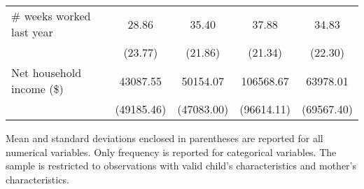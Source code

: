 \begin{table}[!t]
\begin{threeparttable}
\begin{tabular}{l*{4}{c}}
$\#$ weeks worked last year&       28.86&       35.40&       37.88&       34.83\\
                    &     (23.77)&     (21.86)&     (21.34)&     (22.30)\\

Net household income (\$)&    43087.55&    50154.07&   106568.67&    63978.01\\
                    &  (49185.46)&  (47083.00)&  (96614.11)&  (69567.40)\\
\bottomrule
\end{tabular}
	\end{threeparttable}
	\begin{tablenotes}[flushleft] \footnotesize
	\item Mean and standard deviations enclosed in parentheses are reported for all numerical variables. Only frequency is reported for categorical variables. The sample is restricted to observations with valid child's characteristics and mother's characteristics.
	\end{tablenotes}
\end{table}
